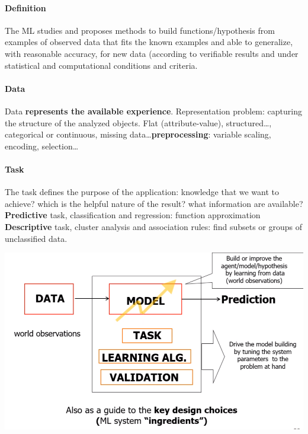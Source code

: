 \documentclass[10pt]{report}
\begin{document}
\paragraph{Definition} The ML studies and proposes methods to build functions/hypothesis from examples of observed data that fits the known examples and able to generalize, with reasonable accuracy, for new data (according to verifiable results and under statistical and computational conditions and criteria.
\paragraph{Data} Data \textbf{represents the available experience}. Representation problem: capturing the structure of the analyzed objects. Flat (attribute-value), structured\ldots, categorical or continuous, missing data\ldots \textbf{preprocessing}: variable scaling, encoding, selection\ldots
\paragraph{Task} The task defines the purpose of the application: knowledge that we want to achieve? which is the helpful nature of the result? what information are available?\\
\textbf{Predictive} task, classification and regression: function approximation\\
\textbf{Descriptive} task, cluster analysis and association rules: find subsets or groups of unclassified data.
\begin{center}
	\includegraphics[scale=0.5]{1.png}
\end{center}
\pagebreak
\end{document}
